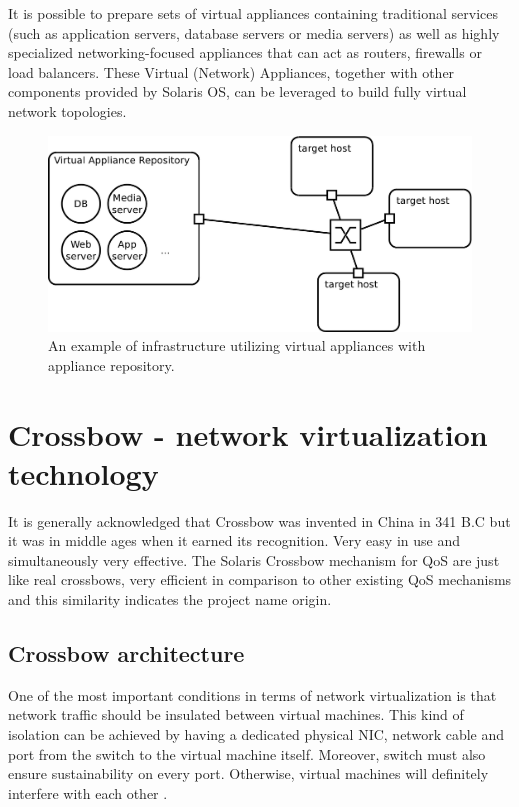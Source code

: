 \documentclass[11pt]{book}
\begin{document}
        It is possible to prepare sets of virtual appliances containing traditional services (such as application
        servers, database servers or media servers) as well as highly specialized networking-focused appliances that can
        act as routers, firewalls or load balancers. These Virtual (Network) Appliances, together with other components
        provided by Solaris OS,  can be leveraged to build fully virtual network topologies.

        \begin{figure}[H]
          \begin{center}
            \includegraphics[width=.7\textwidth]{img/solaris/virtual-appliance-infra.pdf}
          \end{center}

          \caption{An example of infrastructure utilizing virtual appliances with appliance repository.}
        \end{figure}


    \section{Crossbow - network virtualization technology}
    \label{sec:sol:xbow}


      It is generally acknowledged that Crossbow was invented in China in 341 B.C but it was in middle ages when 
      it earned its recognition. Very easy in use and simultaneously very effective. The Solaris Crossbow mechanism 
      for QoS are just like real crossbows, very efficient in comparison to other existing QoS mechanisms and this
      similarity indicates the project name origin.


      \subsection{Crossbow architecture}

        One of the most important conditions in terms of network virtualization is that network traffic should be
        insulated between virtual machines. This kind of isolation can be achieved by having a dedicated physical NIC,
        network cable and port from the switch to the virtual machine itself. Moreover, switch must also ensure
        sustainability on every port. Otherwise, virtual machines will definitely interfere with each other \cite{crossbow}.
        
\end{document}
